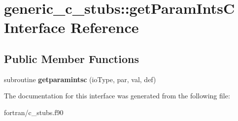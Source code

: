 \hypertarget{interfacegeneric__c__stubs_1_1get_param_ints_c}{}\section{generic\+\_\+c\+\_\+stubs\+:\+:get\+Param\+IntsC Interface Reference}
\label{interfacegeneric__c__stubs_1_1get_param_ints_c}
\subsection*{Public Member Functions}
\begin{DoxyCompactItemize}
\item 
\mbox{\label{interfacegeneric__c__stubs_1_1get_param_ints_c_a8736db686bbdb7fead065a32faa34b24}} 
subroutine {\bfseries getparamintsc} (io\+Type, par, val, def)
\end{DoxyCompactItemize}


The documentation for this interface was generated from the following file\+:\begin{DoxyCompactItemize}
\item 
fortran/c\+\_\+stubs.\+f90\end{DoxyCompactItemize}
